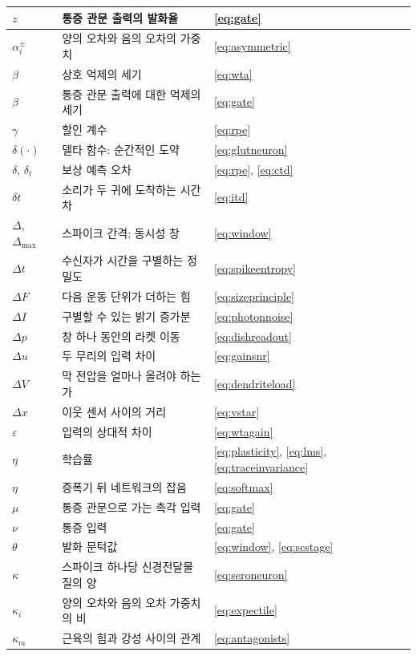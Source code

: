 \begin{center}
\begin{longtable}{>{\raggedright}p{2.0cm}>{\raggedright}p{9.6cm}>{\raggedright\arraybackslash}p{2.4cm}}
$z$ & 통증 관문 출력의 발화율 & \eqref{eq:gate} \\
\midrule
$\alpha_i^\pm$ & 양의 오차와 음의 오차의 가중치 & \eqref{eq:asymmetric} \\
$\beta$ & 상호 억제의 세기 & \eqref{eq:wta} \\
$\beta$ & 통증 관문 출력에 대한 억제의 세기 & \eqref{eq:gate} \\
$\gamma$ & 할인 계수 & \eqref{eq:rpe} \\
$\delta(\cdot)$ & 델타 함수: 순간적인 도약 & \eqref{eq:glutneuron} \\
$\delta$, $\delta_t$ & 보상 예측 오차 & \eqref{eq:rpe}, \eqref{eq:ctd} \\
$\delta t$ & 소리가 두 귀에 도착하는 시간 차 & \eqref{eq:itd} \\
$\Delta$, $\Delta_{\max}$ & 스파이크 간격; 동시성 창 & \eqref{eq:window} \\
$\Delta t$ & 수신자가 시간을 구별하는 정밀도 & \eqref{eq:spikeentropy} \\
$\Delta F$ & 다음 운동 단위가 더하는 힘 & \eqref{eq:sizeprinciple} \\
$\Delta I$ & 구별할 수 있는 밝기 증가분 & \eqref{eq:photonnoise} \\
$\Delta p$ & 창 하나 동안의 라켓 이동 & \eqref{eq:dishreadout} \\
$\Delta u$ & 두 무리의 입력 차이 & \eqref{eq:gainsnr} \\
$\Delta V$ & 막 전압을 얼마나 올려야 하는가 & \eqref{eq:dendriteload} \\
$\Delta x$ & 이웃 센서 사이의 거리 & \eqref{eq:vstar} \\
$\varepsilon$ & 입력의 상대적 차이 & \eqref{eq:wtagain} \\
$\eta$ & 학습률 & \eqref{eq:plasticity}, \eqref{eq:lms}, \eqref{eq:traceinvariance} \\
$\eta$ & 증폭기 뒤 네트워크의 잡음 & \eqref{eq:softmax} \\
$\mu$ & 통증 관문으로 가는 촉각 입력 & \eqref{eq:gate} \\
$\nu$ & 통증 입력 & \eqref{eq:gate} \\
$\theta$ & 발화 문턱값 & \eqref{eq:window}, \eqref{eq:scstage} \\
$\kappa$ & 스파이크 하나당 신경전달물질의 양 & \eqref{eq:seroneuron} \\
$\kappa_i$ & 양의 오차와 음의 오차 가중치의 비 & \eqref{eq:expectile} \\
$\kappa_m$ & 근육의 힘과 강성 사이의 관계 & \eqref{eq:antagonists} \\

\end{longtable}
\end{center}
